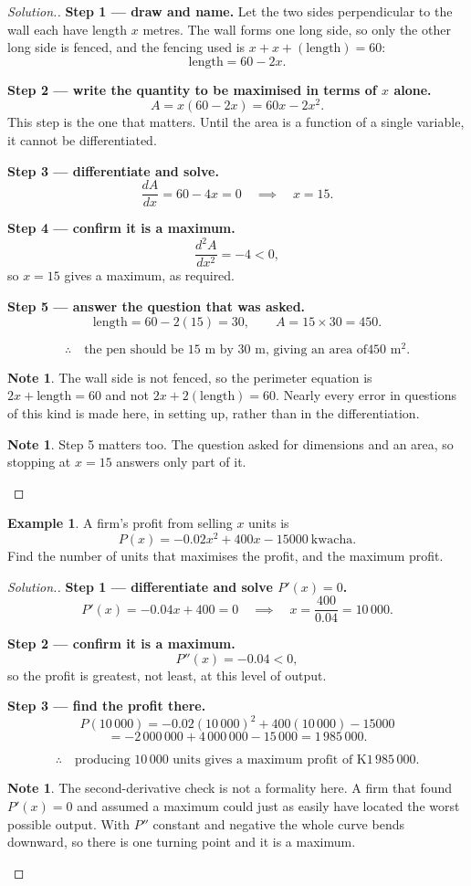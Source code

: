 \documentclass[11pt,a4paper]{article}
\theoremstyle{definition}
\newtheorem{example}[thm]{Example}
\newtheorem{note}[thm]{Note}
\newenvironment{solution}
  {\renewcommand{\qedsymbol}{}\begin{proof}[\textit{Solution}.]}
  {\end{proof}}
\begin{document}
\begin{solution}
\textbf{Step 1 --- draw and name.} Let the two sides perpendicular to the wall each have
length $x$ metres. The wall forms one long side, so only the other long side is fenced,
and the fencing used is $x+x+(\text{length})=60$:
$$\text{length}=60-2x.$$

\textbf{Step 2 --- write the quantity to be maximised in terms of $x$ alone.}
$$A=x(60-2x)=60x-2x^2.$$
This step is the one that matters. Until the area is a function of a single variable, it
cannot be differentiated.

\textbf{Step 3 --- differentiate and solve.}
$$\frac{dA}{dx}=60-4x=0\quad\implies\quad x=15.$$

\textbf{Step 4 --- confirm it is a maximum.}
$$\frac{d^2A}{dx^2}=-4<0,$$
so $x=15$ gives a maximum, as required.

\textbf{Step 5 --- answer the question that was asked.}
$$\text{length}=60-2(15)=30,\qquad A=15\times 30=450.$$

$$\therefore\quad \text{the pen should be } 15\text{ m by } 30\text{ m, giving an area of
} 450\text{ m}^2.$$

\begin{note}
The wall side is not fenced, so the perimeter equation is $2x+\text{length}=60$ and not
$2x+2(\text{length})=60$. Nearly every error in questions of this kind is made here, in
setting up, rather than in the differentiation.
\end{note}

\begin{note}
Step 5 matters too. The question asked for dimensions and an area, so stopping at
$x=15$ answers only part of it.
\end{note}
\end{solution}

\begin{example}
A firm's profit from selling $x$ units is
$$P(x)=-0.02x^2+400x-15000\ \text{kwacha}.$$
Find the number of units that maximises the profit, and the maximum profit.
\end{example}

\begin{solution}
\textbf{Step 1 --- differentiate and solve $P'(x)=0$.}
$$P'(x)=-0.04x+400=0\quad\implies\quad x=\frac{400}{0.04}=10\,000.$$

\textbf{Step 2 --- confirm it is a maximum.}
$$P''(x)=-0.04<0,$$
so the profit is greatest, not least, at this level of output.

\textbf{Step 3 --- find the profit there.}
$$P(10\,000)=-0.02(10\,000)^2+400(10\,000)-15000$$
$$=-2\,000\,000+4\,000\,000-15\,000=1\,985\,000.$$

$$\therefore\quad \text{producing } 10\,000 \text{ units gives a maximum profit of
K}1\,985\,000.$$

\begin{note}
The second-derivative check is not a formality here. A firm that found
$P'(x)=0$ and assumed a maximum could just as easily have located the worst possible
output. With $P''$ constant and negative the whole curve bends downward, so there is one
turning point and it is a maximum.
\end{note}
\end{solution}
\end{document}
